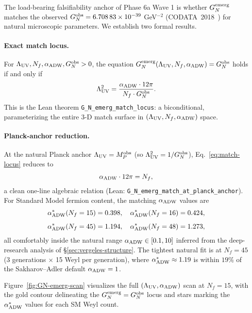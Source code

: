 \documentclass[aps,prd,twocolumn,showpacs,superscriptaddress,nofootinbib]{revtex4-2}
\newcommand{\GNobs}{G_{N}^{\rm obs}}
\newcommand{\GNemerg}{G_{N}^{\rm emerg}}
\newcommand{\Lambdauv}{\Lambda_{\rm UV}}
\newcommand{\Mpl}{M_{P}}
\newcommand{\Nf}{N_{f}}
\newcommand{\aADW}{\alpha_{\rm ADW}}
\begin{document}
The load-bearing falsifiability anchor of Phase 6a Wave 1 is whether
$\GNemerg$ matches the observed $\GNobs = 6.708\,83 \times 10^{-39}$
GeV${}^{-2}$ (CODATA~2018~\cite{Tiesinga2021CODATA}) for natural
microscopic parameters. We establish two formal results.

\paragraph*{Exact match locus.}
For $\Lambdauv,\Nf,\aADW,\GNobs > 0$, the equation
$\GNemerg(\Lambdauv,\Nf,\aADW) = \GNobs$ holds if and only if
\begin{equation}
\label{eq:match-locus}
\Lambdauv^{2} = \frac{\aADW \cdot 12\pi}{\Nf \cdot \GNobs}.
\end{equation}
This is the Lean theorem \texttt{G\_N\_emerg\_match\_locus}: a
biconditional, parameterizing the entire 3-D match surface in
$(\Lambdauv,\Nf,\aADW)$ space.

\paragraph*{Planck-anchor reduction.}
At the natural Planck anchor $\Lambdauv = \Mpl^{\rm obs}$ (so
$\Lambdauv^{2} = 1/\GNobs$), Eq.~\eqref{eq:match-locus} reduces to
\begin{equation}
\label{eq:planck-anchor}
\aADW \cdot 12\pi = \Nf,
\end{equation}
a clean one-line algebraic relation (Lean:
\texttt{G\_N\_emerg\_match\_at\_planck\_anchor}). For Standard
Model fermion content, the matching $\aADW$ values are
\begin{equation}
\aADW^{*}(\Nf=15) = 0.398,\quad
\aADW^{*}(\Nf=16) = 0.424,
\end{equation}
\begin{equation}
\aADW^{*}(\Nf=45) = 1.194,\quad
\aADW^{*}(\Nf=48) = 1.273,
\end{equation}
all comfortably inside the natural range $\aADW \in [0.1, 10]$
inferred from the deep-research analysis of \S\ref{sec:vergeles-structure}.
The tightest natural fit is at $\Nf = 45$ (3 generations $\times$ 15
Weyl per generation), where $\aADW^{*} \approx 1.19$ is within $19\%$
of the Sakharov--Adler default $\aADW = 1$.

Figure~\ref{fig:GN-emerg-scan} visualizes the full
$(\Lambdauv,\aADW)$ scan at $\Nf = 15$, with the gold contour
delineating the $\GNemerg = \GNobs$ locus and stars marking the
$\aADW^{*}$ values for each SM Weyl count.
\end{document}
